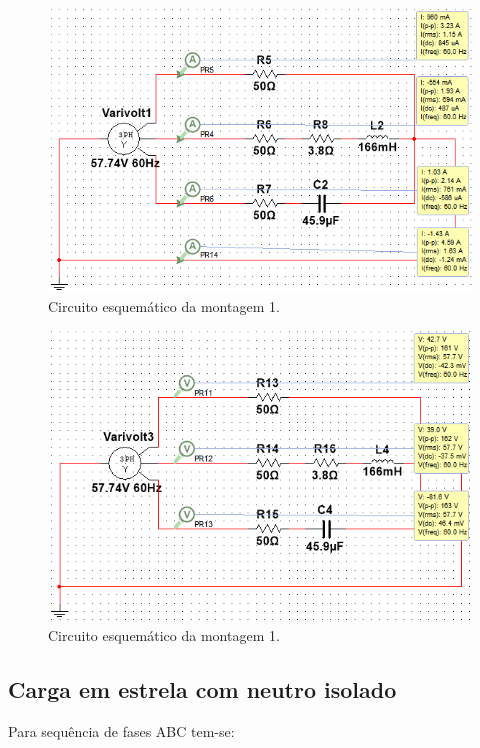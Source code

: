 \documentclass[a4paper,12pt,oneside,openany,table,xcdraw]{article}
\begin{document}
\begin{figure}[H]
\centering
\includegraphics[width=13.5cm]{m1-esquema-cba-correntes}
\caption{Circuito esquemático da montagem 1.}
\label{m2:IL}
\end{figure}
\begin{figure}[H]
\centering
\includegraphics[width=13.5cm]{m1-esquema-cba-vf}
\caption{Circuito esquemático da montagem 1.}
\label{m2:VF}
\end{figure}

\subsection{Carga em estrela com neutro isolado}
Para sequência de fases ABC tem-se: 
\end{document}
